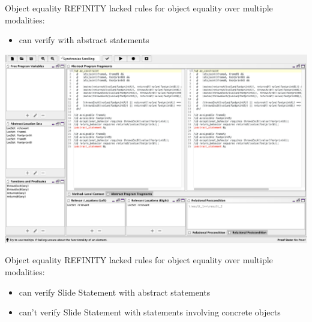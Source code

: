 \begin{frame}{Object equality}
REFINITY lacked rules for object equality over multiple modalities:
\begin{itemize}
\item can verify  with abstract statements
\end{itemize}
\end{frame}

\begin{frame}\vspace*{-5mm}
\begin{center}
  \includegraphics[scale=.25]{screenshots/SlideAbstract}
\end{center}
\end{frame}

\begin{frame}{Object equality}
REFINITY lacked rules for object equality over multiple modalities:
\begin{itemize}
\item can verify Slide Statement with abstract statements
\item can't verify Slide Statement with statements involving concrete objects
\end{itemize}
\end{frame}

